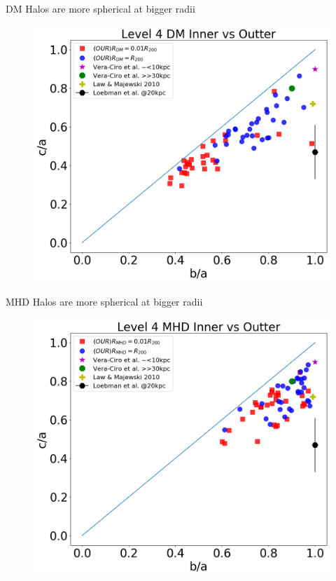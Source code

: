 \documentclass[xcolor=dvipsnames]{beamer}
\begin{document}

\begin{frame}

\centering
DM Halos are more spherical at bigger radii
\begin{figure}[!ht]
  \centering
  \includegraphics[width=0.7\columnwidth]{./pics/Triaxiality_DM_lvl4.png}
  \hfill
\end{figure}
\normalsize

\end{frame}

\begin{frame}

\centering
MHD Halos are more spherical at bigger radii
\begin{figure}[!ht]
  \centering
  \includegraphics[width=0.7\columnwidth]{./pics/Triaxiality_MHD_lvl4.png}
  \hfill

\end{figure}
\normalsize

\end{frame}
\end{document}
